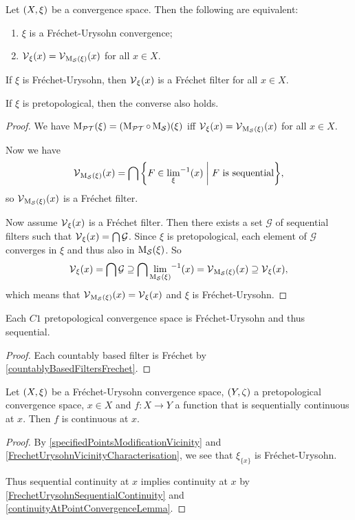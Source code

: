 \begin{proposition} \label{FrechetUrysohnVicinityCharacterisation}
Let $\sSet{X,\xi}$ be a convergence space. Then the following are equivalent:
\begin{enumerate}
\item $\xi$ is a Fréchet-Urysohn convergence;
\item $\operatorname{\mathcal{V}}_\xi(x) = \operatorname{\mathcal{V}}_{\operatorname{M_\mathcal{S}}(\xi)}(x)$ for all $x\in X$.
\end{enumerate}
If $\xi$ is Fréchet-Urysohn, then $\operatorname{\mathcal{V}}_\xi(x)$ is a Fréchet filter for all $x\in X$.

If $\xi$ is pretopological, then the converse also holds.
\end{proposition}
\begin{proof}
We have $\operatorname{M_\mathcal{PT}}(\xi) = (\operatorname{M_\mathcal{PT}}\circ \operatorname{M_\mathcal{S}})(\xi)$ iff $\operatorname{\mathcal{V}}_\xi(x) = \operatorname{\mathcal{V}}_{\operatorname{M_\mathcal{S}}(\xi)}(x)$ for all $x\in X$.

Now we have
\[ \vicinity_{\seqMod(\xi)}(x) = \bigcap\setbuilder{F\in {\lim_{\xi}}^{-1}(x)}{\text{$F$ is sequential}}, \]
so $\operatorname{\mathcal{V}}_{\operatorname{M_\mathcal{S}}(\xi)}(x)$ is a Fréchet filter.

Now assume $\operatorname{\mathcal{V}}_\xi(x)$ is a Fréchet filter. Then there exists a set $\mathcal{G}$ of sequential filters such that $\operatorname{\mathcal{V}}_\xi(x) = \bigcap \mathcal{G}$. Since $\xi$ is pretopological, each element of $\mathcal{G}$ converges in $\xi$ and thus also in $\operatorname{M_\mathcal{S}}(\xi)$. So
\[ \operatorname{\mathcal{V}}_\xi(x) = \bigcap \mathcal{G} \supseteq \bigcap {\lim_{\operatorname{M_\mathcal{S}}(\xi)}}^{-1}(x) = \operatorname{\mathcal{V}}_{\operatorname{M_\mathcal{S}}(\xi)}(x) \supseteq \operatorname{\mathcal{V}}_{\xi}(x), \]
which means that $\operatorname{\mathcal{V}}_{\operatorname{M_\mathcal{S}}(\xi)}(x) = \operatorname{\mathcal{V}}_{\xi}(x)$ and $\xi$ is Fréchet-Urysohn.
\end{proof}
\begin{corollary}
Each $C1$ pretopological convergence space is Fréchet-Urysohn and thus sequential.
\end{corollary}
\begin{proof}
Each countably based filter is Fréchet by \ref{countablyBasedFiltersFrechet}.
\end{proof}

\begin{lemma} \label{FrechetUrysohnSequentialContinuityAtAPoint}
Let $\sSet{X,\xi}$ be a Fréchet-Urysohn convergence space, $\sSet{Y,\zeta}$ a pretopological convergence space, $x\in X$ and $f: X\to Y$ a function that is sequentially continuous at $x$. Then $f$ is continuous at $x$.
\end{lemma}
\begin{proof}
By \ref{specifiedPointsModificationVicinity} and \ref{FrechetUrysohnVicinityCharacterisation}, we see that $\xi_{\{x\}}$ is Fréchet-Urysohn.

Thus sequential continuity at $x$ implies continuity at $x$ by \ref{FrechetUrysohnSequentialContinuity} and \ref{continuityAtPointConvergenceLemma}.
\end{proof}

